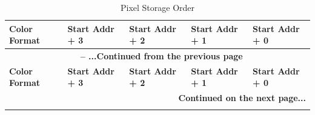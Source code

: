 \documentclass[main\_\_EN.tex]{subfiles}
\begin{document}
\begin{longtable}[c]{ |p{2.5cm}|p{2.5cm}|p{2.5cm}|p{2.5cm}|p{2.5cm}| }
    \caption{Pixel Storage Order}
    \label{tab:color-space-endian}\\\hline

    \rowcolor{lightgray}
    \textbf{Color Format} & \textbf{Start Addr + 3} & \textbf{Start Addr + 2} & \textbf{Start Addr + 1} & \textbf{Start Addr + 0} \\\hline
    \endfirsthead


    \multicolumn{5}{c}{\bfseries \tablename\ \thetable{} -- ...Continued from the previous page}\\\hline
    \rowcolor{lightgray}
    \textbf{Color Format} & \textbf{Start Addr + 3} & \textbf{Start Addr + 2} & \textbf{Start Addr + 1} & \textbf{Start Addr + 0} \\\hline
    \endhead

    \multicolumn{5}{r}{\textbf{Continued on the next page...}} \\
    \endfoot

    \endlastfoot


\end{longtable}
\end{document}
